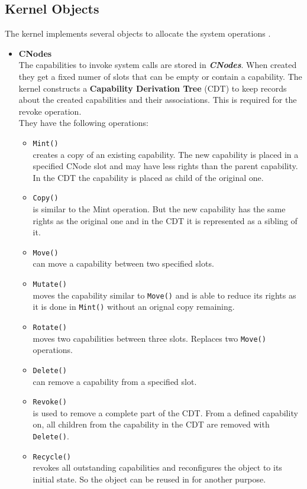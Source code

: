 \subsection{Kernel Objects}\label{sec:KernelObjects}
The kernel implements several objects to allocate the system operations \cite{Manual}.
\begin{itemize}
\item \textbf{CNodes} \\
The capabilities to invoke system calls are stored in \textbf{\textit{CNodes}}. When created they get a fixed numer of slots that can be empty or contain a capability. 
The kernel constructs a \textbf{Capability Derivation Tree} (CDT) to keep records about the created capabilities and their associations. This is required for the revoke operation. \\ 
They have the following operations:
\begin{itemize}
\item \texttt{Mint()} \\
creates a copy of an existing capability. The new capability is placed in a specified CNode slot and may have less rights than the parent capability. In the CDT the capability is placed as child of the original one. 
\item \texttt{Copy()} \\
is similar to the Mint operation. But the new capability has the same rights as the original one and in the CDT it is represented as a sibling of it. 
\item \texttt{Move()} \\
can move a capability between two specified slots. 
\item \texttt{Mutate()} \\
moves the capability similar to \texttt{Move()} and is able to reduce its rights as it is done in \texttt{Mint()} without an orignal copy remaining.
\item \texttt{Rotate()} \\
moves two capabilities between three slots. Replaces two \texttt{Move()} operations. 
\item \texttt{Delete()} \\
can remove a capability from a specified slot.
\item \texttt{Revoke()} \\
is used to remove a complete part of the CDT. From a defined capability on, all children from the capability in the CDT are removed with \texttt{Delete()}. 
\item \texttt{Recycle()} \\
revokes all outstanding capabilities and reconfigures the object to its initial state. So the object can be reused in for another purpose.
\end{itemize}


\end{itemize}
